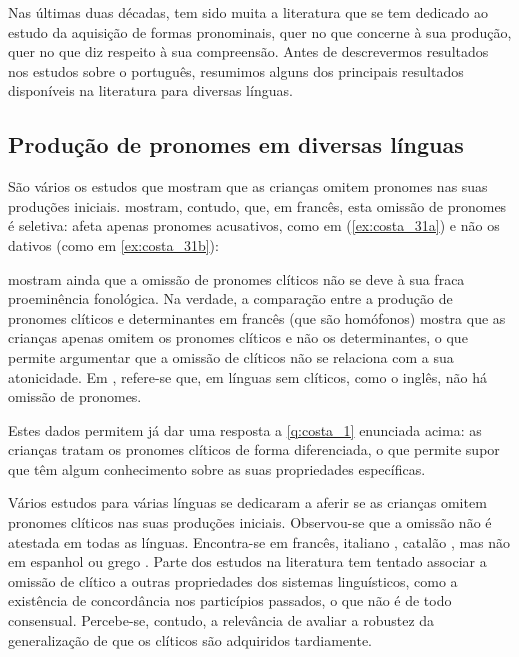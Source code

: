 \documentclass[output=paper]{LSP/langsci}
\begin{document}
Nas últimas duas décadas, tem sido muita a literatura que se tem dedicado ao estudo da aquisição de formas pronominais, quer no que concerne à sua produção, quer no que diz respeito à sua compreensão. Antes de descrevermos resultados nos estudos sobre o português, resumimos alguns dos principais resultados disponíveis na literatura para diversas línguas.


\subsection{Produção de pronomes em diversas línguas}
\label{subsec:costa_producao_pronomes}

São vários os estudos que mostram que as crianças omitem pronomes nas suas produções iniciais. \citet{jakubowicz_etal1998} mostram, contudo, que, em francês, esta omissão de pronomes é seletiva: afeta apenas pronomes acusativos, como em (\ref{ex:costa_31a}) e não os dativos (como em \ref{ex:costa_31b}):

\ea\label{ex:costa_31}
\zl

\citet{jakubowicz_etal1998} mostram ainda que a omissão de pronomes clíticos não se deve à sua fraca proeminência fonológica. Na verdade, a comparação entre a produção de pronomes clíticos e determinantes em francês (que são homófonos) mostra que as crianças apenas omitem os pronomes clíticos e não os determinantes, o que permite argumentar que a omissão de clíticos não se relaciona com a sua atonicidade. Em \citet{varlokosta_etal2015}, refere-se que, em línguas sem clíticos, como o inglês, não há omissão de pronomes.

Estes dados permitem já dar uma resposta a \ref{q:costa_1} enunciada acima: as crianças tratam os pronomes clíticos de forma diferenciada, o que permite supor que têm algum conhecimento sobre as suas propriedades específicas.

Vários estudos para várias línguas se dedicaram a aferir se as crianças omitem pronomes clíticos nas suas produções iniciais. Observou-se que a omissão não é atestada em todas as línguas. Encontra-se em francês, italiano \citep{schaeffer1997}, catalão \citep{wexler_etal2004}, mas não em espanhol \citep{wexler_etal2004} ou grego \citep{tskaliwexler2003}. Parte dos estudos na literatura tem tentado associar a omissão de clítico a outras propriedades dos sistemas linguísticos, como a existência de concordância nos particípios passados, o que não é de todo consensual. Percebe-se, contudo, a relevância de avaliar a robustez da generalização de que os clíticos são adquiridos tardiamente.
\end{document}
